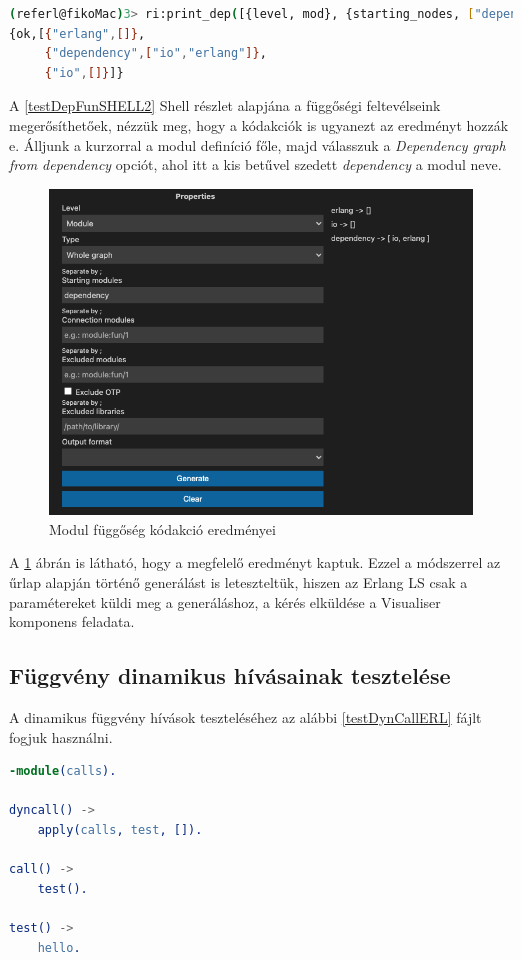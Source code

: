\lstset{caption=Függvány függőség lekérdezésének eredménye, label=src:sh} \label{testDepFunSHELL2}
\begin{lstlisting}[language={sh}]  
(referl@fikoMac)3> ri:print_dep([{level, mod}, {starting_nodes, ["dependency"]}]).              
{ok,[{"erlang",[]},
     {"dependency",["io","erlang"]},
     {"io",[]}]}
\end{lstlisting}

A \ref{testDepFunSHELL2} Shell részlet alapjána a függőségi feltevélseink megerősíthetőek, nézzük meg, hogy a kódakciók is ugyanezt az eredményt hozzák e. Álljunk a kurzorral a modul definíció főle, majd válasszuk a \textit{Dependency graph from dependency} opciót, ahol itt a kis betűvel szedett \textit{dependency} a modul neve. 


\begin{figure}[H]
  \centering
  \includegraphics[width=0.8\linewidth]{images/testCases/depMod.png}
  \caption{Modul függőség kódakció eredményei}
  \label{fig:depMod}
\end{figure}

A \ref{fig:depMod} ábrán is látható, hogy a megfelelő eredményt kaptuk. Ezzel a módszerrel az űrlap alapján történő generálást is leteszteltük, hiszen az Erlang LS csak a paramétereket küldi meg a generáláshoz, a kérés elküldése a Visualiser komponens feladata.


\subsection{Függvény dinamikus hívásainak tesztelése}

A dinamikus függvény hívások teszteléséhez az alábbi \ref{testDynCallERL} fájlt fogjuk használni.

 \label{testDynCallERL}
\begin{lstlisting}[language={erlang}]  
-module(calls).

dyncall() ->
    apply(calls, test, []).

call() ->
    test().

test() ->
    hello.
\end{lstlisting}

